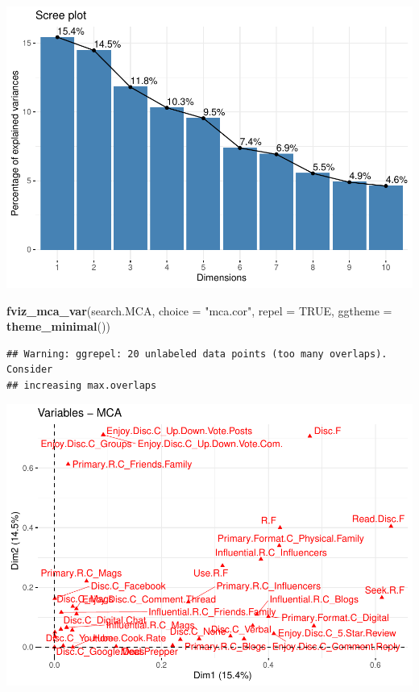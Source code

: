 \documentclass[
]{article}
\newenvironment{Shaded}{\begin{snugshade}}{\end{snugshade}}
\newcommand{\DataTypeTok}[1]{\textcolor[rgb]{0.13,0.29,0.53}{#1}}
\newcommand{\KeywordTok}[1]{\textcolor[rgb]{0.13,0.29,0.53}{\textbf{#1}}}
\newcommand{\NormalTok}[1]{#1}
\newcommand{\OtherTok}[1]{\textcolor[rgb]{0.56,0.35,0.01}{#1}}
\newcommand{\StringTok}[1]{\textcolor[rgb]{0.31,0.60,0.02}{#1}}
\begin{document}
\includegraphics{Average-User-MCA_files/figure-latex/diet no social-1.pdf}

\begin{Shaded}
\begin{Highlighting}[]
\KeywordTok{fviz_mca_var}\NormalTok{(search.MCA, }\DataTypeTok{choice =} \StringTok{"mca.cor"}\NormalTok{, }\DataTypeTok{repel =} \OtherTok{TRUE}\NormalTok{,}
             \DataTypeTok{ggtheme =} \KeywordTok{theme_minimal}\NormalTok{())}
\end{Highlighting}
\end{Shaded}

\begin{verbatim}
## Warning: ggrepel: 20 unlabeled data points (too many overlaps). Consider
## increasing max.overlaps
\end{verbatim}

\includegraphics{Average-User-MCA_files/figure-latex/diet no social-2.pdf}
\end{document}
